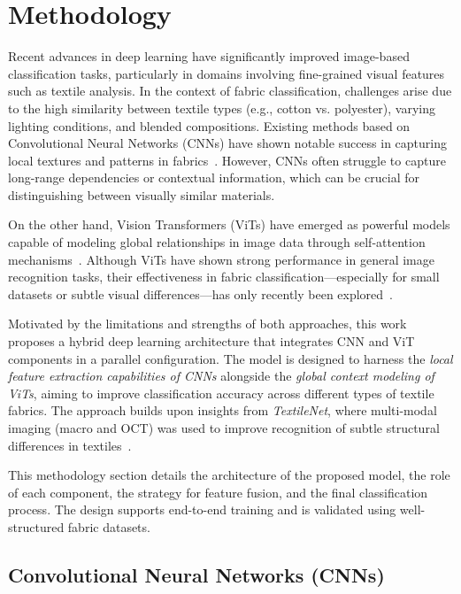\section{Methodology}

Recent advances in deep learning have significantly improved image-based classification tasks, particularly in domains involving fine-grained visual features such as textile analysis. In the context of fabric classification, challenges arise due to the high similarity between textile types (e.g., cotton vs. polyester), varying lighting conditions, and blended compositions. Existing methods based on Convolutional Neural Networks (CNNs) have shown notable success in capturing local textures and patterns in fabrics~\cite{hong2024research, kampouris2016fine}. However, CNNs often struggle to capture long-range dependencies or contextual information, which can be crucial for distinguishing between visually similar materials.

On the other hand, Vision Transformers (ViTs) have emerged as powerful models capable of modeling global relationships in image data through self-attention mechanisms~\cite{dosovitskiy2020vit}. Although ViTs have shown strong performance in general image recognition tasks, their effectiveness in fabric classification—especially for small datasets or subtle visual differences—has only recently been explored~\cite{chitra2023fabric}.

Motivated by the limitations and strengths of both approaches, this work proposes a hybrid deep learning architecture that integrates CNN and ViT components in a parallel configuration. The model is designed to harness the \textit{local feature extraction capabilities of CNNs} alongside the \textit{global context modeling of ViTs}, aiming to improve classification accuracy across different types of textile fabrics. The approach builds upon insights from \textit{TextileNet}, where multi-modal imaging (macro and OCT) was used to improve recognition of subtle structural differences in textiles~\cite{siam2023textilenet}.

This methodology section details the architecture of the proposed model, the role of each component, the strategy for feature fusion, and the final classification process. The design supports end-to-end training and is validated using well-structured fabric datasets.

\subsection{Convolutional Neural Networks (CNNs)}

